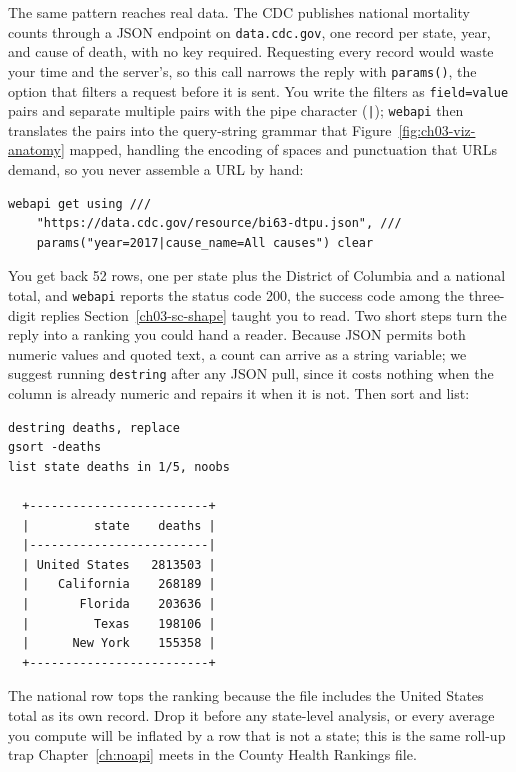 The same pattern reaches real data. The CDC publishes national mortality counts through a JSON endpoint on \texttt{data.cdc.gov}, one record per state, year, and cause of death, with no key required. Requesting every record would waste your time and the server's, so this call narrows the reply with \texttt{params()}, the option that filters a request before it is sent. You write the filters as \texttt{field=value} pairs and separate multiple pairs with the pipe character (\texttt{|}); \texttt{webapi} then translates the pairs into the query-string grammar that Figure~\ref{fig:ch03-viz-anatomy} mapped, handling the encoding of spaces and punctuation that URLs demand, so you never assemble a URL by hand:
\par
{\footnotesize
\begin{verbatim}
webapi get using ///
    "https://data.cdc.gov/resource/bi63-dtpu.json", ///
    params("year=2017|cause_name=All causes") clear
\end{verbatim}
}
You get back 52 rows, one per state plus the District of Columbia and a national total, and \texttt{webapi} reports the status code 200, the success code among the three-digit replies Section~\ref{ch03-sc-shape} taught you to read. Two short steps turn the reply into a ranking you could hand a reader. Because JSON permits both numeric values and quoted text, a count can arrive as a string variable; we suggest running \texttt{destring} after any JSON pull, since it costs nothing when the column is already numeric and repairs it when it is not. Then sort and list:
\par
{\footnotesize
\begin{verbatim}
destring deaths, replace
gsort -deaths
list state deaths in 1/5, noobs

  +-------------------------+
  |         state    deaths |
  |-------------------------|
  | United States   2813503 |
  |    California    268189 |
  |       Florida    203636 |
  |         Texas    198106 |
  |      New York    155358 |
  +-------------------------+
\end{verbatim}
}
The national row tops the ranking because the file includes the United States total as its own record. Drop it before any state-level analysis, or every average you compute will be inflated by a row that is not a state; this is the same roll-up trap Chapter~\ref{ch:noapi} meets in the County Health Rankings file.

